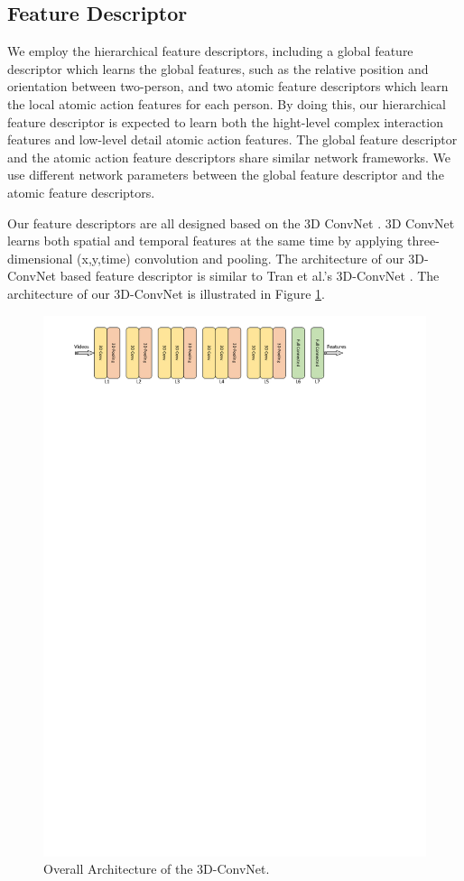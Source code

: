 \subsection{Feature Descriptor}
\label{3_3}
We employ the hierarchical feature descriptors, including a global feature descriptor which learns the global features, such as the relative position and orientation between two-person, and two atomic feature descriptors which learn the local atomic action features for each person. By doing this, our hierarchical feature descriptor is expected to learn both the hight-level complex interaction features and low-level detail atomic action features. The global feature descriptor and the atomic action feature descriptors share similar network frameworks. We use different network parameters between the global feature descriptor and the atomic feature descriptors. 
\par 
Our feature descriptors are all designed based on the 3D ConvNet \cite{Tran2015}. 3D ConvNet learns both spatial and temporal features at the same time by applying three-dimensional (x,y,time) convolution and pooling. The architecture of our 3D-ConvNet based feature descriptor is similar to  Tran et al.'s 3D-ConvNet\cite{Tran2015} . The architecture of our 3D-ConvNet is illustrated in Figure \ref{fig:c3d}. 
\begin{figure}
	\includegraphics[trim=2cm 26cm 0cm 0cm]{fig01/3dConvNet.pdf}
	\caption{Overall Architecture of the 3D-ConvNet. }
	\label{fig:c3d}
\end{figure}

